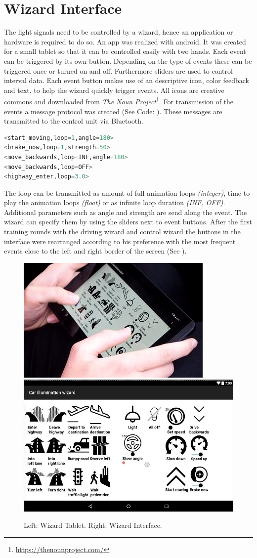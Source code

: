 \section{Wizard Interface}
\label{sec:wizard}
The light signals need to be controlled by a wizard, hence an application or hardware is required to do so. An app was realized with android. It was created for a small tablet so that it can be controlled easily with two hands. Each event can be triggered by its own button. Depending on the type of events these can be triggered once or turned on and off. Furthermore sliders are used to control interval data. Each event button makes use of an descriptive icon, color feedback and text, to help the wizard quickly trigger events. All icons are creative commons and downloaded from \emph{The Noun Project}\footnote{\url{https://thenounproject.com/}}. For transmission of the events a message protocol was created (See Code: ). These messages are transmitted to the control unit via Bluetooth. 

\begin{lstlisting}[caption={Examples of event messages.},label={lst:eventmessage},language=Python]
<start_moving,loop=1,angle=180>
<brake_now,loop=1,strength=50>
<move_backwards,loop=INF,angle=180>
<move_backwards,loop=OFF>
<highway_enter,loop=3.0>
\end{lstlisting}

The loop can be transmitted as amount of full animation loops \emph{(integer)}, time to play the animation loops \emph{(float)} or as infinite loop duration \emph{(INF, OFF)}. Additional parameters such as angle and strength are send along the event. The wizard can specify them by using the sliders next to event buttons.   
After the first training rounds with the driving wizard and control wizard the buttons in the interface were rearranged according to his preference with the most frequent events close to the left and right border of the screen (See  ). 

\begin{figure}
    \includegraphics[height=0.31\textwidth]{fig/WizardHands}\hfill\includegraphics[height=0.31\textwidth]{fig/IlluminationWizard-.JPG}
    \caption[Wizard Tab]{Left: Wizard Tablet. 
   Right: Wizard Interface.}
    \label{fig:wizard}
\end{figure}

